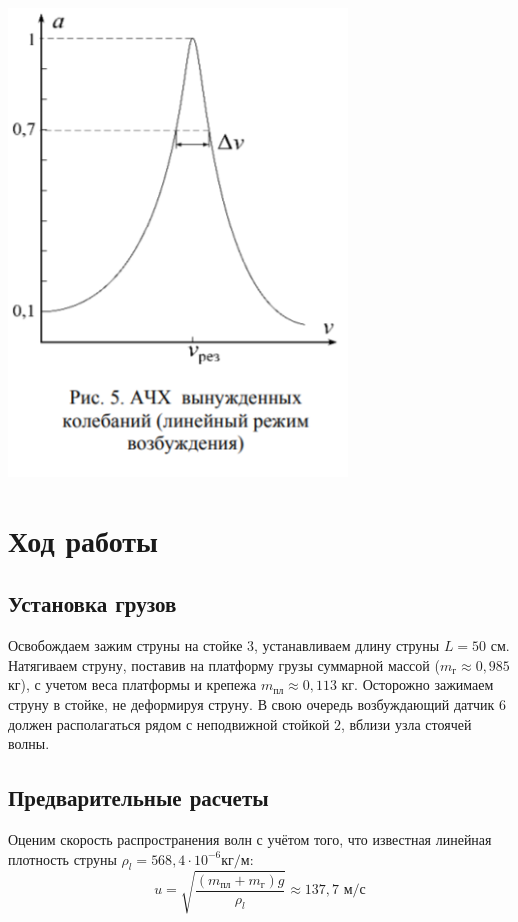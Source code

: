 \documentclass[a4paper, 12pt]{article} %
\begin{document}
\begin{center}
    \includegraphics[width=9cm]{1.4.5 6}
\end{center}

\section{Ход работы}

\subsection{Установка грузов} 

Освобождаем зажим струны на стойке $3$, устанавливаем длину струны $L = 50$ см. Натягиваем струну, поставив на платформу грузы суммарной массой ($m_{\text{г}} \approx 0,985 $ кг), с учетом веса платформы и крепежа $m_{\text{пл}} \approx 0,113$ кг. Осторожно зажимаем струну в стойке, не деформируя струну. В свою очередь возбуждающий датчик $6$ должен располагаться рядом с неподвижной
стойкой $2$, вблизи узла стоячей волны.\\

\subsection{Предварительные расчеты}

Оценим скорость распространения волн с учётом того, что известная линейная плотность струны $\rho_l = 568,4 \cdot 10^{-6} \text{кг/м}$:
\[u = \sqrt{\frac{(m_{\text{пл}} + m_{\text{г}})g}{\rho_l}} \approx 137,7\text{ м/с}\]
\end{document}
